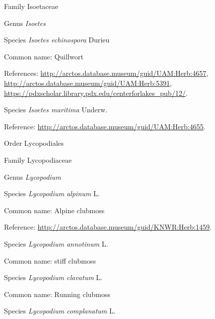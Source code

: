 \documentclass[9pt, article]{memoir}
\begin{document}
\begin{multicols}{2}
\vspace{6pt}\noindent\hspace{24pt}Family Isoetaceae


\vspace{6pt}\noindent\hspace{30pt}Genus \textit{Isoetes}


\vspace{6pt}\noindent\hspace{36pt}Species \textit{Isoetes echinospora} Durieu


Common name: Quillwort

References: 
\url{http://arctos.database.museum/guid/UAM:Herb:4657}, 
\url{http://arctos.database.museum/guid/UAM:Herb:5391}, 
\url{https://pdxscholar.library.pdx.edu/centerforlakes_pub/12/}.

\vspace{6pt}\noindent\hspace{36pt}Species \textit{Isoetes maritima} Underw.


Reference: 
\url{http://arctos.database.museum/guid/UAM:Herb:4655}.

\vspace{6pt}\noindent\hspace{18pt}Order Lycopodiales


\vspace{6pt}\noindent\hspace{24pt}Family Lycopodiaceae


\vspace{6pt}\noindent\hspace{30pt}Genus \textit{Lycopodium}


\vspace{6pt}\noindent\hspace{36pt}Species \textit{Lycopodium alpinum} L.


Common name: Alpine clubmoss

Reference: 
\url{http://arctos.database.museum/guid/KNWR:Herb:1459}.

\vspace{6pt}\noindent\hspace{36pt}Species \textit{Lycopodium annotinum} L.


Common name: stiff clubmoss

\vspace{6pt}\noindent\hspace{36pt}Species \textit{Lycopodium clavatum} L.


Common name: Running clubmoss

\vspace{6pt}\noindent\hspace{36pt}Species \textit{Lycopodium complanatum} L.



\end{multicols}
\end{document}
